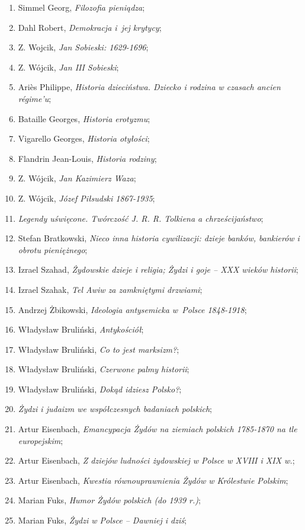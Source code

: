 \documentclass[a4paper,11pt]{article}
\begin{document}
\begin{enumerate}
\item Simmel Georg, \emph{Filozofia pieniądza};
\item Dahl Robert, \emph{Demokracja i~jej krytycy};
\item Z. Wojcik, \emph{Jan Sobieski: 1629-1696};
\item Z. Wójcik, \emph{Jan III Sobieski};
\item Ariès Philippe, \emph{Historia dzieciństwa. Dziecko i rodzina w
    czasach ancien régime’u};
\item Bataille Georges, \emph{Historia erotyzmu};
\item Vigarello Georges, \emph{Historia otyłości};
\item Flandrin Jean-Louis, \emph{Historia rodziny};
\item Z. Wójcik, \emph{Jan Kazimierz Waza};
\item Z. Wójcik, \emph{Józef Piłsudski 1867-1935};
\item \emph{Legendy uświęcone. Twórczość J. R. R. Tolkiena a
    chrześcijaństwo};
\item Stefan Bratkowski, \emph{Nieco inna historia cywilizacji: dzieje
    banków, bankierów i obrotu pieniężnego};
\item Izrael Szahad, \emph{Żydowskie dzieje i religia; Żydzi i goje –
    XXX wieków historii};
\item Izrael Szahak, \emph{Tel Awiw za zamkniętymi drzwiami};
\item Andrzej Żbikowski, \emph{Ideologia antysemicka w~Polsce
    1848-1918};
\item Władysław Bruliński, \emph{Antykościół};
\item Władysław Bruliński, \emph{Co to jest marksizm?};
\item Władysław Bruliński, \emph{Czerwone palmy historii};
\item Władysław Bruliński, \emph{Dokąd idziesz Polsko?};
\item \emph{Żydzi i judaizm we współczesnych badaniach polskich};
\item Artur Eisenbach, \emph{Emancypacja Żydów na ziemiach polskich
    1785-1870 na tle europejskim};
\item Artur Eisenbach, \emph{Z dziejów ludności żydowskiej w Polsce w
    XVIII i XIX w.};
\item Artur Eisenbach, \emph{Kwestia równouprawnienia Żydów w
    Królestwie Polskim};
\item Marian Fuks, \emph{Humor Żydów polskich (do 1939 r.)};
\item Marian Fuks, \emph{Żydzi w Polsce – Dawniej i dziś};

\end{enumerate}
\end{document}
